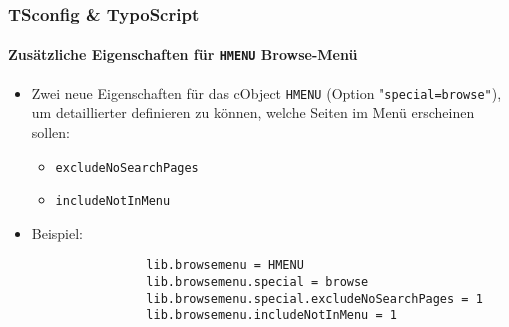 
\begin{frame}[fragile]
	\frametitle{TSconfig \& TypoScript}
	\framesubtitle{Zusätzliche Eigenschaften für \texttt{HMENU} Browse-Menü}

	\begin{itemize}
		\item Zwei neue Eigenschaften für das cObject \texttt{HMENU} (Option
			"\texttt{special=browse"}), um detaillierter definieren zu können,
			welche Seiten im Menü erscheinen sollen:

			\begin{itemize}
				\item \texttt{excludeNoSearchPages}
				\item \texttt{includeNotInMenu}
			\end{itemize}

		\item Beispiel:

			\begin{lstlisting}
				lib.browsemenu = HMENU
				lib.browsemenu.special = browse
				lib.browsemenu.special.excludeNoSearchPages = 1
				lib.browsemenu.includeNotInMenu = 1
			\end{lstlisting}

	\end{itemize}

\end{frame}


